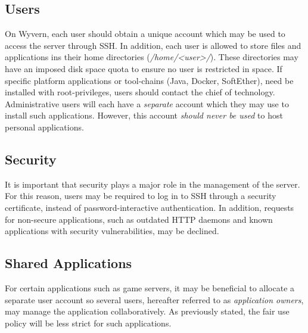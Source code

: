 \documentclass[a4paper]{article}
\begin{document}
\subsection{Users}
On Wyvern, each user should obtain a unique account which may be used to access the server through SSH. In addition, each user is allowed to store files and applications ins their home directories (\textit{/home/<user>/}). These directories may have an imposed disk space quota to ensure no user is restricted in space. If specific platform applications or tool-chains (Java, Docker, SoftEther), need be installed with root-privileges, users should contact the chief of technology. Administrative users will each have a \textit{separate} account which they may use to install such applications. However, this account \textit{should never be used} to host personal applications.

\subsection{Security}
It is important that security plays a major role in the management of the server. For this reason, users may be required to log in to SSH through a security certificate, instead of password-interactive authentication. In addition, requests for non-secure applications, such as outdated HTTP daemons and known applications with security vulnerabilities, may be declined.

\subsection{Shared Applications}
For certain applications such as game servers, it may be beneficial to allocate a separate user account so several users, hereafter referred to as \textit{application owners}, may manage the application collaboratively. As previously stated, the fair use policy will be less strict for such applications.
\end{document}

